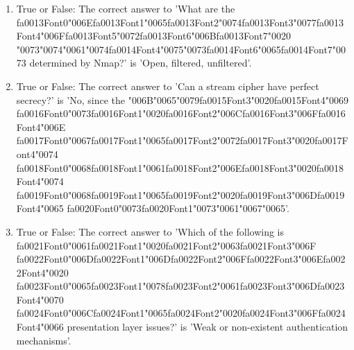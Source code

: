 \documentclass[12pt]{article}
\begin{document}
\begin{enumerate}[label=\arabic*.]
\item True or False: The correct answer to 'What are the {\csname fa0013Font0\endcsname\char"006E}{\csname fa0013Font1\endcsname\char"0065}{\csname fa0013Font2\endcsname\char"0074}{\csname fa0013Font3\endcsname\char"0077}{\csname fa0013Font4\endcsname\char"006F}{\csname fa0013Font5\endcsname\char"0072}{\csname fa0013Font6\endcsname\char"006B}{\csname fa0013Font7\endcsname\char"0020} {\char"0073}{\char"0074}{\char"0061}{\char"0074}{\csname fa0014Font4\endcsname\char"0075}{\char"0073}{\csname fa0014Font6\endcsname\char"0065}{\csname fa0014Font7\endcsname\char"0073} determined by Nmap?' is 'Open, filtered, unfiltered'.
\item True or False: The correct answer to 'Can a stream cipher have perfect secrecy?' is 'No, since the {\char"006B}{\char"0065}{\char"0079}{\csname fa0015Font3\endcsname\char"0020}{\csname fa0015Font4\endcsname\char"0069} {\csname fa0016Font0\endcsname\char"0073}{\csname fa0016Font1\endcsname\char"0020}{\csname fa0016Font2\endcsname\char"006C}{\csname fa0016Font3\endcsname\char"006F}{\csname fa0016Font4\endcsname\char"006E} {\csname fa0017Font0\endcsname\char"0067}{\csname fa0017Font1\endcsname\char"0065}{\csname fa0017Font2\endcsname\char"0072}{\csname fa0017Font3\endcsname\char"0020}{\csname fa0017Font4\endcsname\char"0074} {\csname fa0018Font0\endcsname\char"0068}{\csname fa0018Font1\endcsname\char"0061}{\csname fa0018Font2\endcsname\char"006E}{\csname fa0018Font3\endcsname\char"0020}{\csname fa0018Font4\endcsname\char"0074} {\csname fa0019Font0\endcsname\char"0068}{\csname fa0019Font1\endcsname\char"0065}{\csname fa0019Font2\endcsname\char"0020}{\csname fa0019Font3\endcsname\char"006D}{\csname fa0019Font4\endcsname\char"0065} {\csname fa0020Font0\endcsname\char"0073}{\csname fa0020Font1\endcsname\char"0073}{\char"0061}{\char"0067}{\char"0065}'.
\item True or False: The correct answer to 'Which of the following is {\csname fa0021Font0\endcsname\char"0061}{\csname fa0021Font1\endcsname\char"0020}{\csname fa0021Font2\endcsname\char"0063}{\csname fa0021Font3\endcsname\char"006F} {\csname fa0022Font0\endcsname\char"006D}{\csname fa0022Font1\endcsname\char"006D}{\csname fa0022Font2\endcsname\char"006F}{\csname fa0022Font3\endcsname\char"006E}{\csname fa0022Font4\endcsname\char"0020} {\csname fa0023Font0\endcsname\char"0065}{\csname fa0023Font1\endcsname\char"0078}{\csname fa0023Font2\endcsname\char"0061}{\csname fa0023Font3\endcsname\char"006D}{\csname fa0023Font4\endcsname\char"0070} {\csname fa0024Font0\endcsname\char"006C}{\csname fa0024Font1\endcsname\char"0065}{\csname fa0024Font2\endcsname\char"0020}{\csname fa0024Font3\endcsname\char"006F}{\csname fa0024Font4\endcsname\char"0066} presentation layer issues?' is 'Weak or non-existent authentication mechanisms'.

\end{enumerate}
\end{document}
